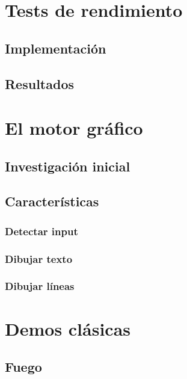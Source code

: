 
\chapter{Tests de rendimiento}

\section{Implementación}
\section{Resultados}

\chapter{El motor gráfico}

\section{Investigación inicial}

\section{Características}
\subsection{Detectar input}
\subsection{Dibujar texto}
\subsection{Dibujar líneas}

\chapter{Demos clásicas}

\section{Fuego}

